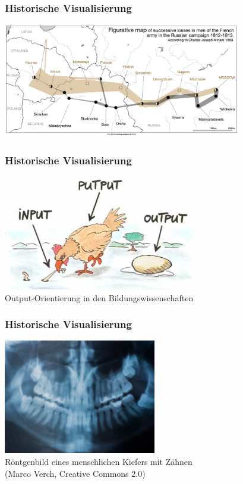 \begin{frame}
\frametitle{Historische Visualisierung}

\vfill
\begin{center}
	\includegraphics[height=50mm]{fig5/historical-napoleon.png}
\end{center}
\vfill
\end{frame}


\begin{frame}
\frametitle{Historische Visualisierung}

\vfill
\begin{center}
	\includegraphics[height=50mm]{fig5/historical-putput.png} \\
	\scriptsize Output-Orientierung in den Bildungswissenschaften
\end{center}
\vfill
\end{frame}


\begin{frame}
\frametitle{Historische Visualisierung}

\vfill
\begin{center}
	\includegraphics[height=50mm]{fig5/historical-roentgen.jpg} \\
	\scriptsize Röntgenbild eines menschlichen Kiefers mit Zähnen \\
	\tiny (Marco Verch, Creative Commons 2.0)
\end{center}
\vfill
\end{frame}


